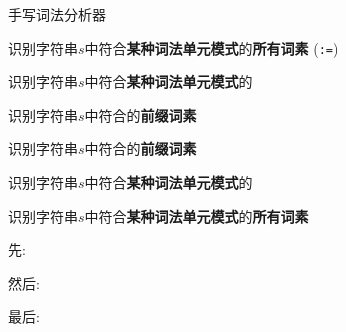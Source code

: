 
\begin{frame}{}

  \begin{center}
    手写词法分析器
  \end{center}
\end{frame}

\begin{frame}{}
  \begin{center}
    识别字符串$s$中符合{\bf 某种词法单元模式}的{\bf 所有词素}
    \ws \quad \ifkw \quad \elsekw \quad \id \quad \blue{\intnum \quad \floatnum \quad \scinum}
    \quad \relop \quad \assign\; (\texttt{:=})

    \pause
    \vspace{0.80cm}
    识别字符串$s$中符合{\bf 某种词法单元模式}的

    \pause
    \vspace{0.80cm}
    识别字符串$s$中符合的{\bf 前缀词素}
  \end{center}
\end{frame}

\begin{frame}{}
  \begin{center}
    识别字符串$s$中符合的{\bf 前缀词素}

    \vspace{0.80cm}

    \vspace{0.80cm}
    识别字符串$s$中符合{\bf 某种词法单元模式}的

    \vspace{0.80cm}

    \vspace{0.80cm}
    识别字符串$s$中符合{\bf 某种词法单元模式}的{\bf 所有词素}
  \end{center}
\end{frame}

\begin{frame}{}
  \begin{center}
    先: \ws \quad \ifkw \quad \elsekw \quad \id \quad \intnum

    \vspace{1.00cm}
    然后: \relop

    \vspace{1.00cm}
    最后: \floatnum \quad \scinum

    \vspace{1.00cm}
  \end{center}
\end{frame}

